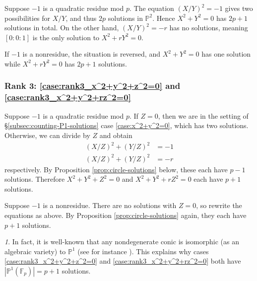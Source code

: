 \documentclass[10pt,a4paper]{amsart}
\numberwithin{equation}{section}
\numberwithin{figure}{section}
\theoremstyle{definition}
\theoremstyle{remark}
\newtheorem*{rem*}{\protect\remarkname}
\theoremstyle{plain}
\theoremstyle{plain}
\theoremstyle{definition}
\theoremstyle{plain}
\theoremstyle{plain}
\providecommand{\remarkname}{Remark}
\renewcommand{\P}{\mathbb{P}}
\newcommand{\F}{\mathbb{F}}
\begin{document}
	Suppose $-1$ is a quadratic residue mod $p$. The equation $(X/Y)^2 = -1$ gives
	two possibilities for $X/Y$, and thus $2p$ solutions in $\mathbb{P}^2$. Hence
	$X^2 + Y^2 = 0$ has $2p + 1$ solutions in total. On the other hand, $(X/Y)^2 =
	-r$ has no solutions, meaning $[0:0:1]$ is the only solution to $X^2 + rY^2 =
	0$.
	
	If $-1$ is a nonresidue, the situation is reversed, and $X^2 + Y^2 = 0$ has one
	solution while $X^2 + rY^2 = 0$ has $2p + 1$ solutions.
	
	\subsubsection*{Rank 3: \eqref{case:rank3_x^2+y^2+z^2=0} and \eqref{case:rank3_x^2+y^2+rz^2=0}} 
	Suppose $-1$ is a quadratic residue mod $p$. If $Z = 0$, then we are in the setting of
	\S\ref{subsec:counting-P1-solutions} case \eqref{case:x^2+y^2=0}, which has two
	solutions. Otherwise, we can divide by $Z$ and obtain 
	\begin{align*} 
	(X/Z)^2 + (Y/Z)^2 &= -1 \\ 
	(X/Z)^2 + (Y/Z)^2 &= -r 
	\end{align*} 
	respectively. By Proposition \ref{prop:circle-solutions} below, these each have $p - 1$
	solutions. Therefore $X^2 + Y^2 + Z^2 = 0$ and $X^2 + Y^2 + rZ^2 = 0$ each have
	$p+1$ solutions.
	
	Suppose $-1$ is a nonresidue. There are no solutions with $Z=0$, so rewrite the
	equations as above. By Proposition \ref{prop:circle-solutions} again, they each
	have $p + 1$ solutions.

    \begin{rem*}
      In fact, it is well-known that any nondegenerate conic is isomorphic (as an algebraic variety) to $\P^1$ (see for instance \cite[Prop.~19.3.1]{vakil}). This explains why cases \eqref{case:rank3_x^2+y^2+z^2=0} and \eqref{case:rank3_x^2+y^2+rz^2=0} both have $|\P^1(\F_p)|=p+1$ solutions.
    \end{rem*}
	
\end{document}
